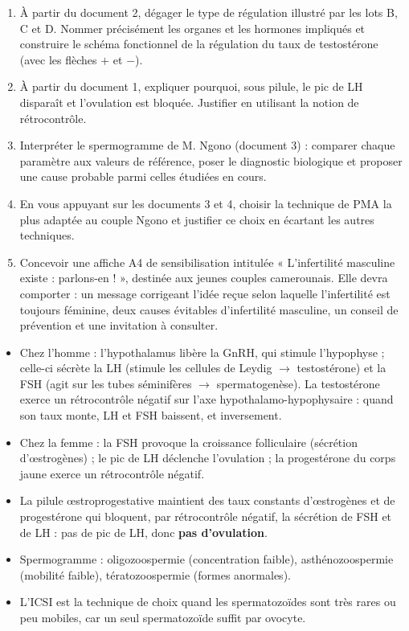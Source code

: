 \documentclass[11pt]{article}
\newcommand{\cle}[1]{{\popxbold\color{popdark}#1}}
\newcounter{popsec}
\newcounter{popsub}
\newcommand{\courssub}[1]{%
  \stepcounter{popsub}%
  \par\vspace{9pt}\noindent{\popxbold\fontsize{11.5}{13}\selectfont\color{popink}{\color{poporange}\thepopsec.\thepopsub}\hspace{6pt}#1}\par\nopagebreak\vspace{4pt}
}
\begin{document}
\begin{enumerate}
\item À partir du document 2, dégager le type de régulation illustré par les lots B, C et D. Nommer précisément les organes et les hormones impliqués et construire le \cle{schéma fonctionnel} de la régulation du taux de testostérone (avec les flèches $+$ et $-$).
\item À partir du document 1, expliquer pourquoi, sous pilule, le pic de LH disparaît et l'ovulation est bloquée. Justifier en utilisant la notion de rétrocontrôle.
\item Interpréter le spermogramme de M. Ngono (document 3) : comparer chaque paramètre aux valeurs de référence, poser le diagnostic biologique et proposer une cause probable parmi celles étudiées en cours.
\item En vous appuyant sur les documents 3 et 4, choisir la technique de PMA la plus adaptée au couple Ngono et justifier ce choix en écartant les autres techniques.
\item Concevoir une affiche A4 de sensibilisation intitulée « L'infertilité masculine existe : parlons-en ! », destinée aux jeunes couples camerounais. Elle devra comporter : un message corrigeant l'idée reçue selon laquelle l'infertilité est toujours féminine, deux causes évitables d'infertilité masculine, un conseil de prévention et une invitation à consulter.
\end{enumerate}

\courssub{Ressources à mobiliser}

\begin{aretenir}
\begin{itemize}
\item Chez l'homme : l'\cle{hypothalamus} libère la \cle{GnRH}, qui stimule l'\cle{hypophyse} ; celle-ci sécrète la \cle{LH} (stimule les cellules de Leydig $\rightarrow$ testostérone) et la \cle{FSH} (agit sur les tubes séminifères $\rightarrow$ spermatogenèse). La testostérone exerce un \cle{rétrocontrôle négatif} sur l'axe hypothalamo-hypophysaire : quand son taux monte, LH et FSH baissent, et inversement.
\item Chez la femme : la \cle{FSH} provoque la croissance folliculaire (sécrétion d'{\oe}strogènes) ; le \cle{pic de LH} déclenche l'ovulation ; la progestérone du corps jaune exerce un rétrocontrôle négatif.
\item La \cle{pilule {\oe}stroprogestative} maintient des taux constants d'{\oe}strogènes et de progestérone qui bloquent, par rétrocontrôle négatif, la sécrétion de FSH et de LH : pas de pic de LH, donc \textbf{pas d'ovulation}.
\item Spermogramme : \cle{oligozoospermie} (concentration faible), \cle{asthénozoospermie} (mobilité faible), \cle{tératozoospermie} (formes anormales).
\item L'\cle{ICSI} est la technique de choix quand les spermatozoïdes sont très rares ou peu mobiles, car un seul spermatozoïde suffit par ovocyte.
\end{itemize}
\end{aretenir}
\end{document}

